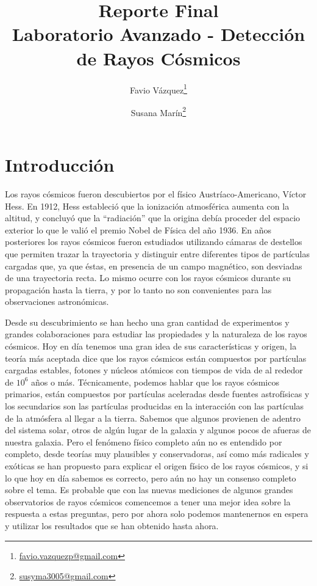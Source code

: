\documentclass[a4paper,10pt]{article}
\title{{\huge Reporte Final} \\
\vspace{.2cm}
\large Laboratorio Avanzado - Detección de Rayos Cósmicos}
\author[1]{Favio Vázquez\footnote{\url{favio.vazquezp@gmail.com}}}
\author[2]{Susana Marín\footnote{\url{susyma3005@gmail.com}}}
\affil[1]{Instituto de Ciencias Nucleares,
Universidad Nacional Autónoma de México}
\affil[2]{Instituto de Química,
Universidad Nacional Autónoma de México}
\date{}
\numberwithin{equation}{section}
\begin{document}
\maketitle

\section*{Introducción}

Los rayos cósmicos fueron descubiertos por el físico Austríaco-Americano, Víctor
Hess. En 1912, Hess estableció que la ionización atmosférica aumenta con la
altitud, y concluyó que la “radiación” que la origina debía proceder del espacio
exterior lo que le valió el premio Nobel de Física del año 1936. En años posteriores
los rayos cósmicos fueron estudiados utilizando cámaras de destellos que permiten 
trazar la trayectoria y distinguir entre diferentes tipos de partículas cargadas que,
ya que éstas, en presencia de un campo magnético, son desviadas de una trayectoria
recta. Lo mismo ocurre con los rayos cósmicos durante su propagación hasta la 
tierra, y por lo tanto no son convenientes para las observaciones astronómicas. 

\vspace{.3cm}

Desde su descubrimiento se han hecho una gran cantidad de experimentos y grandes 
colaboraciones para estudiar las propiedades y la naturaleza de los rayos cósmicos. 
Hoy en día tenemos una gran idea de sus características y origen, la teoría 
más aceptada dice que los rayos cósmicos están compuestos por partículas cargadas 
estables, fotones y núcleos atómicos con tiempos de vida de al rededor de 
$10^6$ años o más. Técnicamente, podemos hablar que los rayos cósmicos primarios, 
están compuestos por partículas aceleradas desde fuentes astrofísicas y los secundarios 
son las partículas producidas en la interacción con las partículas de la atmósfera 
al llegar a la tierra. Sabemos que algunos provienen de adentro del sistema solar, 
otros de algún lugar de la galaxia y algunos pocos de afueras de nuestra galaxia. Pero 
el fenómeno físico completo aún no es entendido por completo, desde teorías muy plausibles 
y conservadoras, así como más radicales y exóticas se han propuesto para explicar 
el origen físico de los rayos cósmicos, y si lo que hoy en día sabemos es correcto, pero 
aún no hay un consenso completo sobre el tema. Es probable que con las nuevas mediciones 
de algunos grandes observatorios de rayos cósmicos comencemos a tener una mejor idea 
sobre la respuesta a estas preguntas, pero por ahora solo podemos mantenernos en espera 
y utilizar los resultados que se han obtenido hasta ahora.
\end{document}
